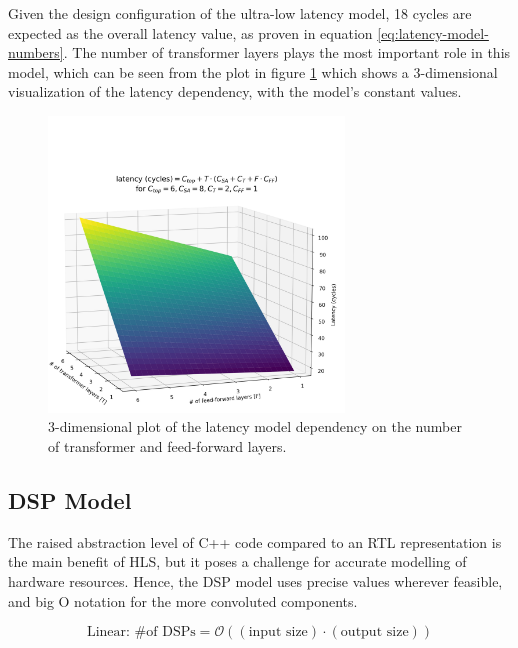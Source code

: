Given the design configuration of the ultra-low latency model, 18 cycles are expected as the overall latency value, as proven in equation \ref{eq:latency-model-numbers}. The number of transformer layers plays the most important role in this model, which can be seen from the plot in figure \ref{fig:latency-model} which shows a 3-dimensional visualization of the latency dependency, with the model's constant values.

\begin{figure}[hpt!]
  \centering
  \includegraphics[trim={0cm 0cm 0cm 4cm}, clip, width=0.7\textwidth, center]{../logs/latency_model.png}
  \caption{3-dimensional plot of the latency model dependency on the number of transformer and feed-forward layers.}
  \label{fig:latency-model}
\end{figure}

\subsection{DSP Model}
The raised abstraction level of C++ code compared to an RTL representation is the main benefit of HLS, but it poses a challenge for accurate modelling of hardware resources. Hence, the DSP model uses precise values wherever feasible, and big O notation for the more convoluted components.

\begin{equation} \label{eq:dsp-linear}
  \text{Linear: \# of DSPs} = \mathcal{O}( (\text{input size}) \cdot (\text{output size}) )
\end{equation}

